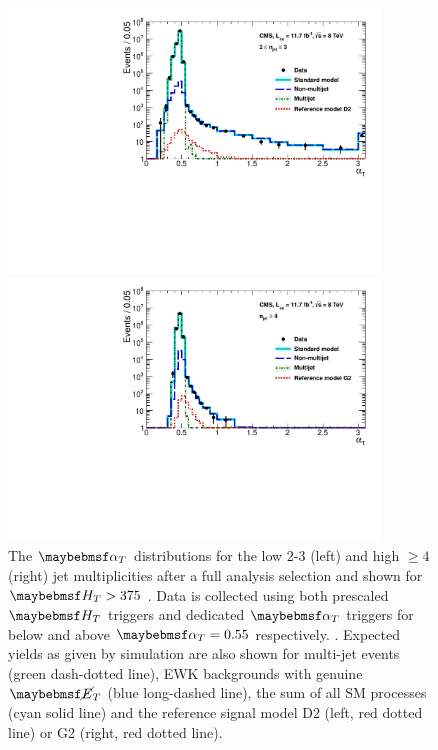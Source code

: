 \begin{figure}[ht]
\centering
\begin{minipage}[b]{0.48 \linewidth}
\includegraphics[width = 1.0\linewidth,height = 7.0cm]{plots/alphat_low.pdf}
\end{minipage}
\quad
\begin{minipage}[b]{0.48\linewidth}
\includegraphics[width = 1.0\linewidth, height = 7.0cm]{plots/alphat_high.pdf}
\end{minipage}
\caption[ The $\alphat$ distributions for the low 2-3 (left) and high $\geq 4$ (right) jet multiplicities after a full analysis selection and shown for $\theht > 375$.]{The $\alphat$ distributions for the low 2-3 (left) and high $\geq 4$ (right) jet multiplicities after a full analysis selection and shown for $\theht > 375$ . Data is collected using both prescaled $\theht$ triggers and dedicated $\alphat$ triggers for below and above $\alphat = 0.55$ respectively. . Expected yields as given by simulation are also shown for multi-jet events (green dash-dotted line), \ac{EWK} backgrounds with genuine $\met$ (blue long-dashed line), the sum of all \ac{SM} processes (cyan solid line) and the reference signal model D2 (left, red dotted line) or G2 (right, red dotted line). }
\label{fig:fullalphatdistribution}
\end{figure}

